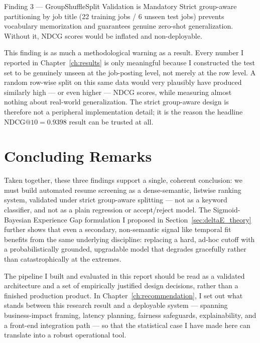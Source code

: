 \begin{keyresult}{Finding 3 --- GroupShuffleSplit Validation is Mandatory}
Strict group-aware partitioning by job title (22 training jobs / 6 unseen test jobs) prevents vocabulary memorization and guarantees genuine zero-shot generalization. Without it, NDCG scores would be inflated and non-deployable.
\end{keyresult}

This finding is as much a methodological warning as a result. Every number I reported in Chapter~\ref{ch:results} is only meaningful because I constructed the test set to be genuinely unseen at the job-posting level, not merely at the row level. A random row-wise split on this same data would very plausibly have produced similarly high --- or even higher --- NDCG scores, while measuring almost nothing about real-world generalization. The strict group-aware design is therefore not a peripheral implementation detail; it is the reason the headline $\text{NDCG}@10 = 0.9398$ result can be trusted at all.

\section{Concluding Remarks}

Taken together, these three findings support a single, coherent conclusion: we must build automated resume screening as a dense-semantic, listwise ranking system, validated under strict group-aware splitting --- not as a keyword classifier, and not as a plain regression or accept/reject model. The Sigmoid-Bayesian Experience Gap formulation I proposed in Section~\ref{sec:deltaE_theory} further shows that even a secondary, non-semantic signal like temporal fit benefits from the same underlying discipline: replacing a hard, ad-hoc cutoff with a probabilistically grounded, upgradable model that degrades gracefully rather than catastrophically at the extremes.

The pipeline I built and evaluated in this report should be read as a validated architecture and a set of empirically justified design decisions, rather than a finished production product. In Chapter~\ref{ch:recommendation}, I set out what stands between this research result and a deployable system --- spanning business-impact framing, latency planning, fairness safeguards, explainability, and a front-end integration path --- so that the statistical case I have made here can translate into a robust operational tool.